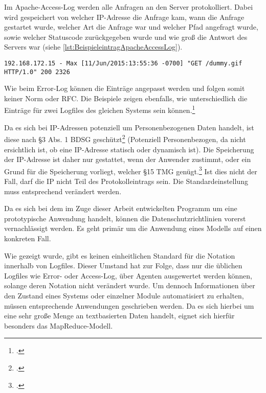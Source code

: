 Im Apache-Access-Log werden alle Anfragen an den Server protokolliert. Dabei wird gespeichert von welcher \ac{IP}-Adresse die Anfrage kam, wann die Anfrage gestartet wurde, welcher Art die Anfrage war und welcher Pfad angefragt wurde, sowie welcher Statuscode zurückgegeben wurde und wie groß die Antwort des Servers war (siehe \autoref{lst:BeispieleintragApacheAccessLog}). \\

\begin{lstlisting}[caption=Beispieleintrag für ein Apache-Access-Log,label=lst:BeispieleintragApacheAccessLog]
192.168.172.15 - Max [11/Jun/2015:13:55:36 -0700] "GET /dummy.gif HTTP/1.0" 200 2326
\end{lstlisting}

Wie beim Error-Log können die Einträge angepasst werden und folgen somit keiner Norm oder \ac{RFC}. Die Beispiele zeigen ebenfalls, wie unterschiedlich die Einträge für zwei Logfiles des gleichen Systems sein können.\footcite[Vgl.][]{ApacheAccessLog.2015}

Da es sich bei \ac{IP}-Adressen potenziell um Personenbezogenen Daten handelt, ist diese nach §3 Abs. 1 \ac{BDSG} geschützt\footcite[§3 Abs. 1 BDSG,][]{BDSG3.1990} (Potenziell Personenbezogen, da nicht ersichtlich ist, ob eine \ac{IP}-Adresse statisch oder dynamisch ist). Die Speicherung der \ac{IP}-Adresse ist daher nur gestattet, wenn der Anwender zustimmt, oder ein Grund für die Speicherung vorliegt, welcher §15 \ac{TMG} genügt.\footcite[§15 TMG,][]{TMG15.2007} Ist dies nicht der Fall, darf die \ac{IP} nicht Teil des Protokolleintrags sein. Die Standardeinstellung muss entsprechend verändert werden.

Da es sich bei dem im Zuge dieser Arbeit entwickelten Programm um eine prototypische Anwendung handelt, können die Datenschutzrichtlinien vorerst vernachlässigt werden. Es geht primär um die Anwendung eines Modells auf einen konkreten Fall.

Wie gezeigt wurde, gibt es keinen einheitlichen Standard für die Notation innerhalb von Logfiles. Dieser Umstand hat zur Folge, dass nur die üblichen Logfiles wie Error- oder Access-Log, über Agenten ausgewertet werden können, solange deren Notation nicht verändert wurde. Um dennoch Informationen über den Zustand eines Systems oder einzelner Module automatisiert zu erhalten, müssen entsprechende Anwendungen geschrieben werden. Da es sich hierbei um eine sehr große Menge an textbasierten Daten handelt, eignet sich hierfür besonders das MapReduce-Modell.

